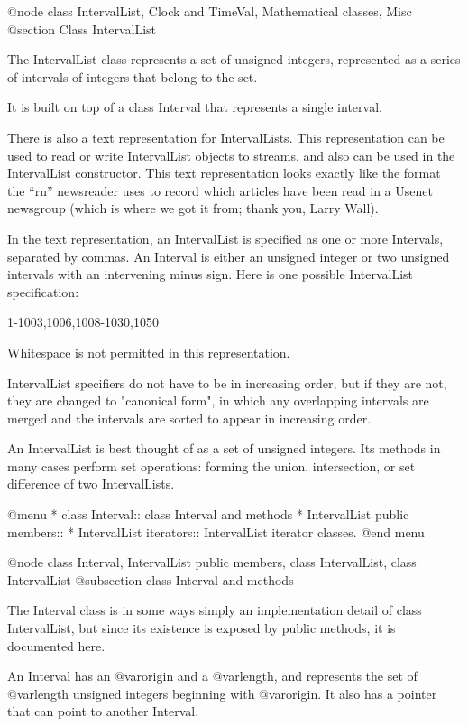 @node class IntervalList, Clock and TimeVal, Mathematical classes, Misc
@section Class IntervalList

The IntervalList class represents a set of unsigned integers, represented
as a series of intervals of integers that belong to the set.

It is built on top of a class Interval that represents a single
interval.

There is also a text representation for IntervalLists.  This
representation can be used to read or write IntervalList objects
to streams, and also can be used in the IntervalList constructor.
This text representation looks exactly like the format the ``rn''
newsreader uses to record which articles have been read in a
Usenet newsgroup (which is where we got it from; thank you, Larry
Wall).

In the text representation, an IntervalList is specified as one
or more Intervals, separated by commas.  An Interval is either
an unsigned integer or two unsigned intervals with an intervening
minus sign.  Here is one possible IntervalList specification:

1-1003,1006,1008-1030,1050

Whitespace is not permitted in this representation.

IntervalList specifiers do not have to be in increasing order,
but if they are not, they are changed to "canonical form", in which
any overlapping intervals are merged and the intervals are sorted
to appear in increasing order.

An IntervalList is best thought of as a set of unsigned integers.
Its methods in many cases perform set operations: forming the
union, intersection, or set difference of two IntervalLists.

@menu
* class Interval::              class Interval and methods
* IntervalList public members::
* IntervalList iterators::      IntervalList iterator classes.
@end menu

@node class Interval, IntervalList public members, class IntervalList, class IntervalList
@subsection class Interval and methods

The Interval class is in some ways simply an implementation detail of
class IntervalList, but since its existence is exposed by public
methods, it is documented here.

An Interval has an @var{origin} and a @var{length}, and represents the
set of @var{length} unsigned integers beginning with @var{origin}.  It
also has a pointer that can point to another Interval.

